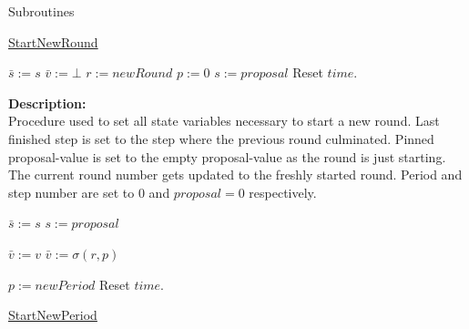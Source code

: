 \documentclass[10pt,a4paper]{article}
\begin{document}
\begin{section}{Subroutines}

\begin{algorithm}[H]\label{algo:start-new-round}
    \caption{\underline{StartNewRound}}
    \label{algo:start-new-round}
    \begin{algorithmic}[1]
    \State $\bar{s} := s$
    \State $\bar{v} := \bot$
    \State $r := newRound$
    \State $p := 0$
    \State $s := proposal$
    \State Reset $time$.
    \EndFunction
    \end{algorithmic}
\end{algorithm}

\noindent \textbf{Description:}\\
Procedure used to set all state variables necessary to start a new round.
Last finished step is set to the step where the previous round culminated.
Pinned proposal-value is set to the empty proposal-value as the round is just starting.
The current round number gets updated to the freshly started round.
Period and step number are set to $0$ and $proposal=0$ respectively.


\begin{algorithm}[H]\label{algo:start-new-period}
    \begin{algorithmic}[1]

    \State $\bar{s} := s$
    \State $s := proposal$

        \State $\bar{v} := v$
        \State $\bar{v} := \sigma(r,p)$
    \EndIf

    \State $p := newPeriod$
    \State Reset $time$.
    \EndFunction
    \end{algorithmic}
    \caption{\underline{StartNewPeriod}}
\end{algorithm}


\end{section}
\end{document}
